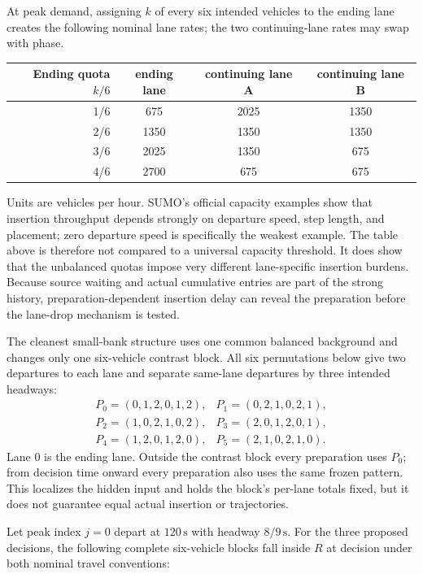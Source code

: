 \documentclass[11pt]{article}
\newcommand{\unit}[1]{\,\mathrm{#1}}
\begin{document}
At peak demand, assigning $k$ of every six intended vehicles to the ending lane
creates the following nominal lane rates; the two continuing-lane rates may swap
with phase.

\begin{table}[h]
\centering
\begin{tabular}{@{}rccc@{}}
\toprule
Ending quota $k/6$ & ending lane & continuing lane A & continuing lane B \\
\midrule
1/6 & 675  & 2025 & 1350 \\
2/6 & 1350 & 1350 & 1350 \\
3/6 & 2025 & 1350 & 675  \\
4/6 & 2700 & 675  & 675  \\
\bottomrule
\end{tabular}
\end{table}

Units are vehicles per hour.  SUMO's official capacity examples show that
insertion throughput depends strongly on departure speed, step length, and
placement; zero departure speed is specifically the weakest example.  The table
above is therefore not compared to a universal capacity threshold.  It does show
that the unbalanced quotas impose very different lane-specific insertion burdens.
Because source waiting and actual cumulative entries are part of the strong
history, preparation-dependent insertion delay can reveal the preparation before
the lane-drop mechanism is tested.

The cleanest small-bank structure uses one common balanced background and changes
only one six-vehicle contrast block.  All six permutations below give two
departures to each lane and separate same-lane departures by three intended
headways:
\[
\begin{array}{lll}
P_0=(0,1,2,0,1,2), & P_1=(0,2,1,0,2,1),\\
P_2=(1,0,2,1,0,2), & P_3=(2,0,1,2,0,1),\\
P_4=(1,2,0,1,2,0), & P_5=(2,1,0,2,1,0).
\end{array}
\]
Lane $0$ is the ending lane.  Outside the contrast block every preparation uses
$P_0$; from decision time onward every preparation also uses the same frozen
pattern.  This localizes the hidden input and holds the block's per-lane totals
fixed, but it does not guarantee equal actual insertion or trajectories.

Let peak index $j=0$ depart at $120\unit{s}$ with headway $8/9\unit{s}$.
For the three proposed decisions, the following complete six-vehicle blocks fall
inside $R$ at decision under both nominal travel conventions:
\end{document}

